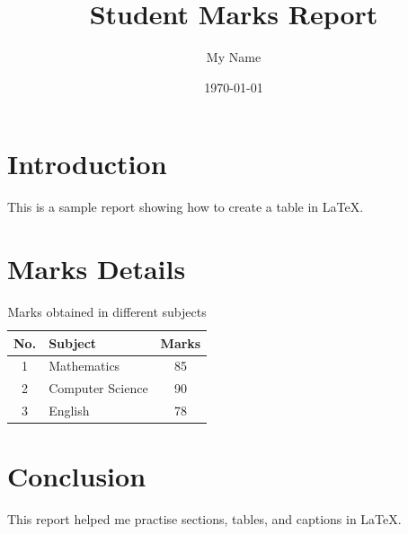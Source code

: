 \documentclass[12pt,a4paper]{article}
\title{Student Marks Report}
\author{My Name}
\date{\today}
\begin{document}
\maketitle

\section{Introduction}
This is a sample report showing how to create a table in LaTeX.

\section{Marks Details}

\begin{table}[h]
\centering
\caption{Marks obtained in different subjects}
\begin{tabular}{|c|l|c|}
\hline
No. & Subject & Marks \\
\hline
1 & Mathematics & 85 \\
2 & Computer Science & 90 \\
3 & English & 78 \\
\hline
\end{tabular}
\end{table}

\section{Conclusion}
This report helped me practise sections, tables, and captions in LaTeX.
\end{document}
